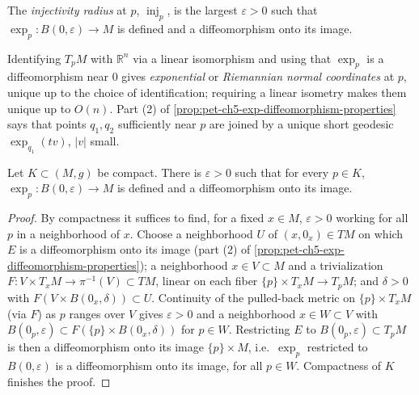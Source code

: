 \begin{definition}
  \label{def:pet-ch5-injectivity-radius}
  \leanok
  The \emph{injectivity radius} at $p$, $\operatorname{inj}_p$, is the largest
  $\varepsilon>0$ such that $\exp_p:B(0,\varepsilon)\to M$ is defined and a
  diffeomorphism onto its image.
\end{definition}

\begin{remark}
  \label{rem:pet-ch5-riemannian-normal-coordinates}
  Identifying $T_pM$ with $\mathbb R^n$ via a linear isomorphism and using that
  $\exp_p$ is a diffeomorphism near $0$ gives \emph{exponential} or \emph{Riemannian
  normal coordinates} at $p$, unique up to the choice of identification; requiring a
  linear isometry makes them unique up to $O(n)$. Part (2) of
  \cref{prop:pet-ch5-exp-diffeomorphism-properties} says that points $q_1,q_2$
  sufficiently near $p$ are joined by a unique short geodesic $\exp_{q_1}(tv)$,
  $|v|$ small.
\end{remark}

\begin{corollary}
  \label{cor:pet-ch5-uniform-injectivity-radius-compact}
  Let $K\subset(M,g)$ be compact. There is $\varepsilon>0$ such that for every
  $p\in K$, $\exp_p:B(0,\varepsilon)\to M$ is defined and a diffeomorphism onto its
  image.
\end{corollary}
\begin{proof}
  By compactness it suffices to find, for a fixed $x\in M$, $\varepsilon>0$ working
  for all $p$ in a neighborhood of $x$. Choose a neighborhood $U$ of $(x,0_x)\in TM$
  on which $E$ is a diffeomorphism onto its image (part (2) of
  \cref{prop:pet-ch5-exp-diffeomorphism-properties}); a neighborhood $x\in V\subset
  M$ and a trivialization $F:V\times T_xM\to\pi^{-1}(V)\subset TM$, linear on each
  fiber $\{p\}\times T_xM\to T_pM$; and $\delta>0$ with
  $F(V\times B(0_x,\delta))\subset U$. Continuity of the pulled-back metric on
  $\{p\}\times T_xM$ (via $F$) as $p$ ranges over $V$ gives $\varepsilon>0$ and a
  neighborhood $x\in W\subset V$ with $B(0_p,\varepsilon)\subset F(\{p\}\times
  B(0_x,\delta))$ for $p\in W$. Restricting $E$ to $B(0_p,\varepsilon)\subset T_pM$
  is then a diffeomorphism onto its image $\{p\}\times M$, i.e.\ $\exp_p$ restricted
  to $B(0,\varepsilon)$ is a diffeomorphism onto its image, for all $p\in W$.
  Compactness of $K$ finishes the proof.
\end{proof}

